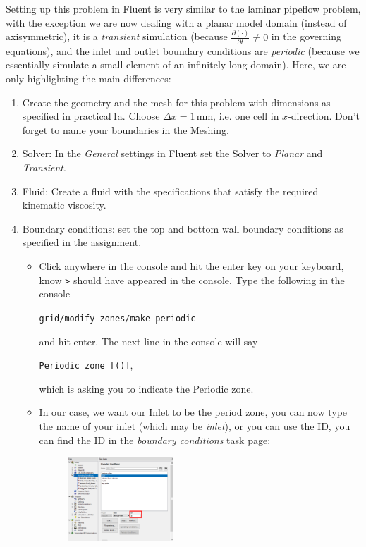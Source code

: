 \documentclass[11pt,a4paper,oneside,hidelinks]{scrartcl}
\begin{document}
Setting up this problem in Fluent is very similar to the laminar pipeflow problem, with the exception we are now dealing with a planar model domain (instead of axisymmetric), it is a \emph{transient} simulation (because $\frac{\partial\left(\cdot\right)}{\partial t}\neq0$ in the governing equations), and the inlet and outlet boundary conditions are \emph{periodic} (because we essentially simulate a small element of an infinitely long domain). Here, we are only highlighting the main differences:

\begin{enumerate}
\item Create the geometry and the mesh for this problem with dimensions as specified in practical\,1a. Choose $\Delta x =1$\,mm, i.e. one cell in $x$-direction. Don't forget to name your boundaries in the Meshing.
\item Solver: In the \emph{General} settings in Fluent set the Solver to \emph{Planar} and \emph{Transient}.
\item Fluid: Create a fluid with the specifications that satisfy the required kinematic viscosity.
\item Boundary conditions: set the top and bottom wall boundary conditions as specified in the assignment. 
    \begin{itemize}
       \item Click anywhere in the console and hit the enter key on your keyboard, know \texttt{>} should have appeared in the console. Type the following in the console 
       \begin{center}
            \texttt{grid/modify-zones/make-periodic}
       \end{center}
 and hit enter. The next line in the console will say  
       \begin{center}
            \texttt{Periodic zone [()]},
       \end{center}
which is asking you to indicate the Periodic zone.
       \item In our case, we want our Inlet to be the period zone, you can now type the name of your inlet (which may be \emph{inlet}), or you can use the ID, you can find the ID in the \emph{boundary conditions} task page:
 \begin{figure}[H]
\begin{center}
\includegraphics[width=0.4\textwidth,clip]{BC_ID.png}

\end{center}
\end{figure}
\end{itemize}
\end{enumerate}
\end{document}
